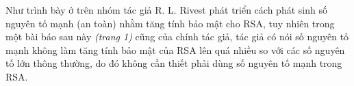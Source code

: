 Như trình bày ở trên nhóm tác giả R. L. Rivest phát triển cách phát sinh số nguyên tố mạnh (an toàn) nhằm tăng tính bảo mật cho RSA, tuy nhiên trong một bài báo sau 
này \cite{AreStrongPrimesNeedForRsa} \textit{(trang 1)} cũng của chính tác giả, tác giả có nói số nguyên tố mạnh không làm tăng tính bảo mật của RSA lên quá nhiều so với các số 
nguyên tố lớn thông thường, do đó không cần thiết phải dùng số nguyên tố mạnh trong RSA.